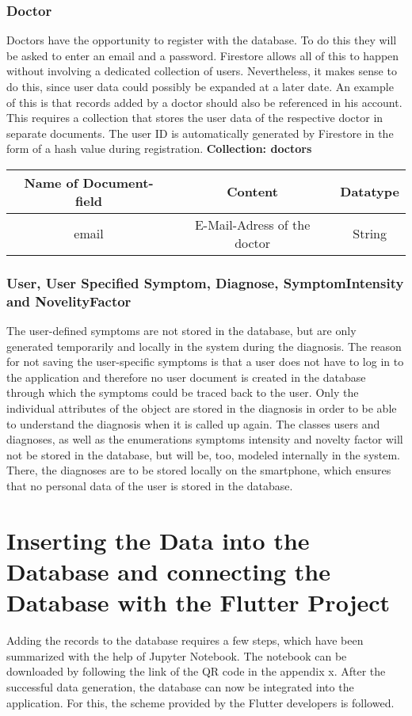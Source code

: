 \subsubsection{Doctor}
Doctors have the opportunity to register with the database. To do this they will be asked to enter an email and a password. Firestore allows all of this to happen without involving a dedicated collection of users. Nevertheless, it makes sense to do this, since user data could possibly be expanded at a later date. An example of this is that records added by a doctor should also be referenced in his account. This requires a collection that stores the user data of the respective doctor in separate documents. The user ID is automatically generated by Firestore in the form of a hash value during registration.
\textbf{Collection: doctors}
		\begin{center}
			\begin{tabular}{ | c| c| c | } 
  				\hline
  				Name of Document-field& Content & Datatype \\  
  				\hline
  				email & E-Mail-Adress of the doctor & String \\
  				\hline
			\end{tabular}
		\end{center}
\subsubsection{User, User Specified Symptom, Diagnose, SymptomIntensity and NovelityFactor}
The user-defined symptoms are not stored in the database, but are only generated temporarily and locally in the system during the diagnosis. The reason for not saving the user-specific symptoms is that a user does not have to log in to the application and therefore no user document is created in the database through which the symptoms could be traced back to the user. Only the individual attributes of the object are stored in the diagnosis in order to be able to understand the diagnosis when it is called up again. The classes users and diagnoses, as well as the enumerations symptoms intensity and novelty factor will not be stored in the database, but will be, too, modeled internally in the system. There, the diagnoses are to be stored locally on the smartphone, which ensures that no personal data of the user is stored in the database.

\section{Inserting the Data into the Database and connecting the Database with the Flutter Project}
Adding the records to the database requires a few steps, which have been summarized with the help of Jupyter Notebook. The notebook can be downloaded by following the link of the QR code in the appendix x. After the successful data generation, the database can now be integrated into the application. For this, the scheme provided by the Flutter developers is followed.
